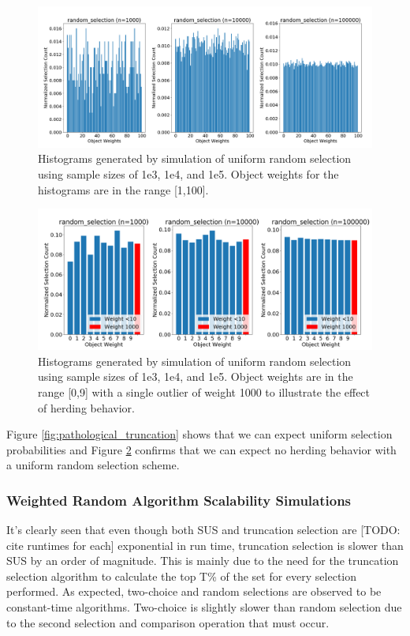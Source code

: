 \documentclass[12pt]{article}
\begin{document}
    \begin{figure}[h]
      \centering
      \includegraphics[scale=0.30]{images/herding_random.png} 
      \caption{Histograms generated by simulation of uniform random selection
               using sample sizes of 1e3, 1e4, and 1e5. Object weights
               for the histograms are in the range [1,100].}
      \label{fig:herding_random}
    \end{figure}

    \begin{figure}[h]
      \centering
      \includegraphics[scale=0.30]{images/pathological_random.png} 
      \caption{Histograms generated by simulation of uniform random selection
               using sample sizes of 1e3, 1e4, and 1e5. Object weights are in
               the range [0,9] with a single outlier of weight 1000 to
               illustrate the effect of herding behavior.}
      \label{fig:pathological_random}
    \end{figure}

    Figure \ref{fig:pathological_truncation} shows that we can expect uniform
    selection probabilities and Figure \ref{fig:pathological_random} confirms
    that we can expect no herding behavior with a uniform random selection
    scheme.

    \subsubsection{Weighted Random Algorithm Scalability Simulations}
    It's clearly seen that even though both SUS and truncation selection are
    [TODO: cite runtimes for each]
    exponential in run time, truncation selection is slower than SUS by an
    order of magnitude. This is mainly due to the need for the truncation
    selection algorithm to calculate the top T\% of the set for every selection
    performed. As expected, two-choice and random selections are
    observed to be constant-time algorithms. Two-choice is slightly slower than
    random selection due to the second selection and comparison operation that
    must occur.
\end{document}
